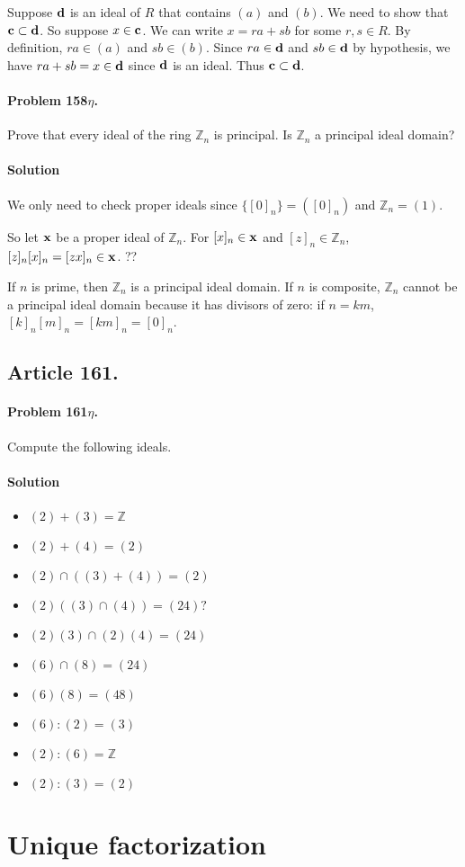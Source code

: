 Suppose $\mathsf{\mathbf{d}}$ is an ideal of $R$ that contains $(a)$ and $(b)$. We need to
show that $ \mathsf{\mathbf{c}} \subset \mathsf{\mathbf{d}}$. So suppose $ x \in \mathsf{\mathbf{c}}$. We can
write $x = ra + sb $ for some $r, s \in R$. By definition, $ ra \in (a) $ and $
sb \in (b) $. Since $ra \in \mathsf{\mathbf{d}}$ and $sb \in \mathsf{\mathbf{d}}$ by hypothesis, we
have $ra + sb = x \in \mathsf{\mathbf{d}}$ since $\mathsf{\mathbf{d}}$ is an ideal.  Thus $ \mathsf{\mathbf{c}}
\subset \mathsf{\mathbf{d}} $.

\paragraph{Problem 158$\eta$.}
Prove that every ideal of the ring $\mathbb{Z}_n$ is principal. Is
$\mathbb{Z}_n$ a principal ideal domain?

\paragraph*{Solution}
We only need to check proper ideals since $\{[0]_n\} = ([0]_n)$ and $\mathbb{Z}_n = (1)$.

So let $\mathsf{\mathbf{x}}$ be a proper ideal of $\mathbb{Z}_n$. For $ [x]_n \in \mathsf{\mathbf{x}}$ and
$ [z]_n \in \mathbb{Z}_n $, $ [z]_n [x]_n = [zx]_n \in \mathsf{\mathbf{x}}$. ??

If $n$ is prime, then $\mathbb{Z}_n$ is a principal ideal domain.  If $n$ is
composite, $\mathbb{Z}_n$ cannot be a principal ideal domain because it has
divisors of zero: if $n = km$, $[k]_n [m]_n = [km]_n = [0]_n$.

\subsection{Article 161.}

\paragraph{Problem 161$\eta$.}
Compute the following ideals.

\paragraph*{Solution}
\begin{itemize}
\item $(2) + (3) = \mathbb{Z}$
\item $(2) + (4) = (2)$
\item $(2) \cap ((3) + (4)) = (2)$
\item $(2)((3) \cap (4)) = (24) ?$
\item $(2)(3) \cap (2)(4) = (24)$
\item $(6) \cap (8) = (24)$
\item $(6)(8) = (48)$
\item $(6) : (2) = (3)$
\item $(2) : (6) = \mathbb{Z}$
\item $(2) : (3) = (2)$
\end{itemize}


\section{Unique factorization}

